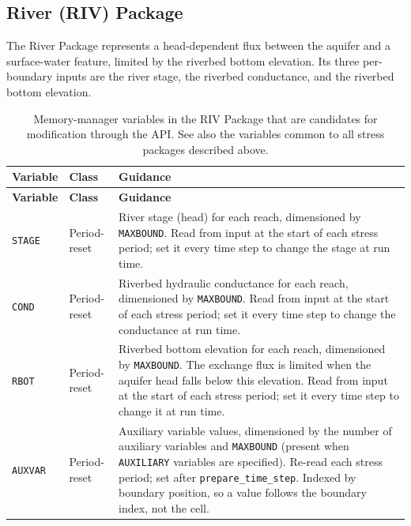 \subsection{River (RIV) Package}

The River Package represents a head-dependent flux between the aquifer and a
surface-water feature, limited by the riverbed bottom elevation. Its three
per-boundary inputs are the river stage, the riverbed conductance, and the
riverbed bottom elevation.

\begin{longtable}{p{} p{} p{}}
\caption{Memory-manager variables in the RIV Package that are candidates for
modification through the API. See also the variables common to all stress
packages described above.} \label{table:api-gwf-riv} \\

\hline
\textbf{Variable} & \textbf{Class} & \textbf{Guidance} \\
\hline
\endfirsthead

\hline
\textbf{Variable} & \textbf{Class} & \textbf{Guidance} \\
\hline
\endhead

\texttt{STAGE} & Period-reset &
River stage (head) for each reach, dimensioned by \texttt{MAXBOUND}. Read from
input at the start of each stress period; set it every time step to change the
stage at run time. \\

\texttt{COND} & Period-reset &
Riverbed hydraulic conductance for each reach, dimensioned by \texttt{MAXBOUND}.
Read from input at the start of each stress period; set it every time step to
change the conductance at run time. \\

\texttt{RBOT} & Period-reset &
Riverbed bottom elevation for each reach, dimensioned by \texttt{MAXBOUND}. The
exchange flux is limited when the aquifer head falls below this elevation. Read
from input at the start of each stress period; set it every time step to change
it at run time. \\

\texttt{AUXVAR} & Period-reset &
Auxiliary variable values, dimensioned by the number of auxiliary variables and
\texttt{MAXBOUND} (present when \texttt{AUXILIARY} variables are specified).
Re-read each stress period; set after \texttt{prepare\_time\_step}. Indexed by
boundary position, so a value follows the boundary index, not the cell. \\


\end{longtable}
